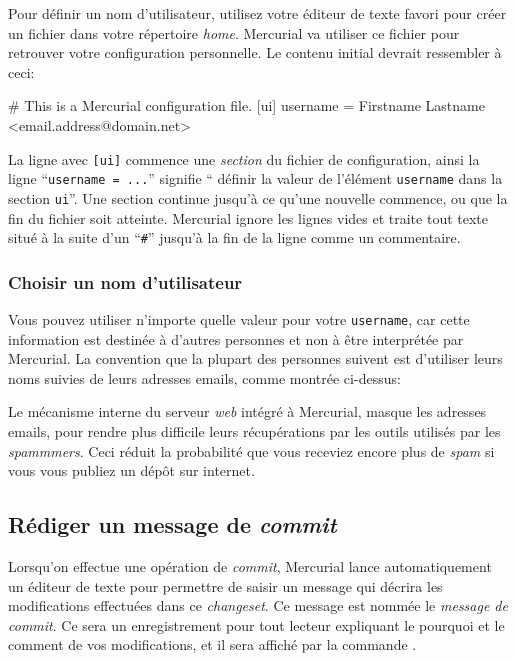 Pour définir un nom d'utilisateur, utilisez votre éditeur de texte favori
pour créer un fichier  dans votre répertoire \textit{home}.
Mercurial va utiliser ce fichier pour retrouver votre configuration personnelle.
Le contenu initial devrait ressembler à ceci:
\begin{codesample2}
  # This is a Mercurial configuration file.
  [ui]
  username = Firstname Lastname <email.address@domain.net>
\end{codesample2}
La ligne avec \texttt{[ui]} commence une \emph{section} du fichier de
configuration, ainsi la ligne ``\texttt{username = ...}'' signifie ``
définir la valeur de l'élément \texttt{username} dans la section 
\texttt{ui}''. Une section continue jusqu'à ce qu'une nouvelle 
commence, ou que la fin du fichier soit atteinte. Mercurial ignore
les lignes vides et traite tout texte situé à la suite d'un  
``\texttt{\#}'' jusqu'à la fin de la ligne comme un commentaire.

\subsubsection{Choisir un nom d'utilisateur}

Vous pouvez utiliser n'importe quelle valeur pour votre \texttt{username},
car cette information est destinée à d'autres personnes et non à être
interprétée par Mercurial. La convention que la plupart des personnes
suivent est d'utiliser leurs noms suivies de leurs adresses emails,
comme montrée ci-dessus:

\begin{note}
  Le mécanisme interne du serveur \textit{web} intégré à Mercurial,
  masque les adresses emails, pour rendre plus difficile leurs
  récupérations par les outils utilisés par les \textit{spammmers}.
  Ceci réduit la probabilité que vous receviez encore plus de 
  \textit{spam} si vous vous publiez un dépôt sur internet.
\end{note}

\subsection{Rédiger un message de \textit{commit}}

Lorsqu'on effectue une opération de \textit{commit}, Mercurial 
lance automatiquement un éditeur de texte pour permettre de saisir
un message qui décrira les modifications effectuées dans ce 
\textit{changeset}. Ce message est nommée le \emph{message de 
\textit{commit}}. Ce sera un enregistrement pour tout lecteur 
expliquant le pourquoi et le comment de vos modifications, et il sera
affiché par la commande .

